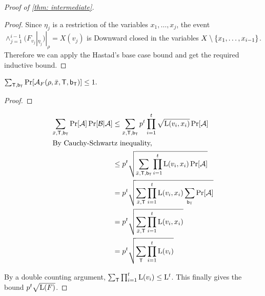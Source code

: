 \begin{proof}[Proof of \cref{thm: intermediate}]
\begin{proof}
Since $\eta_j$ is a restriction of the variables $x_1, \dots , x_j$, the event $\land_{j= 1}^{i-1}(F_{v_j}|_{\eta_j})|_\rho = X(v_j)$ is Downward closed in the variables $X \setminus \left\{ x_1, \dots , x_{i-1} \right\}$. 
Therefore we can apply the Hastad's base case bound and get the required inductive bound. 
\end{proof}
 
\begin{claim}
    $\sum_{\mathsf{\mathsf{T}},\mathsf{b_T}} \Pr[ \mathcal{A}_F(\rho,\bar{x}, \mathsf{T}, \mathsf{b_T})] \le 1.$ 
\end{claim}
\begin{proof}
    \todo{}
\end{proof}

\begin{align*}
\sum_{\bar{x},\mathsf{T},\mathsf{b_T}} \Pr[\mathcal{A}]\Pr[\mathcal{B}|\mathcal{A}] &\le \sum_{\bar{x},\mathsf{T},\mathsf{b_T}} p^t \prod_{i=1}^t\sqrt{\mathrm{L}(v_i,x_i)} \Pr[\mathcal{A}]\\
\intertext{By Cauchy-Schwartz inequality,}
&\le p^t\sqrt{\sum_{\bar{x}, \mathsf{T}, \mathsf{b_T}} \prod_{i=1}^t\mathrm{L}(v_i,x_i)\Pr[\mathcal{A}]}\\
&= p^t\sqrt{\sum_{\bar{x}, \mathsf{T}} \prod_{i=1}^t\mathrm{L}(v_i,x_i)\sum_{\mathsf{b_T}}\Pr[\mathcal{A}]}\\
&= p^t\sqrt{\sum_{\bar{x}, \mathsf{T}} \prod_{i=1}^t\mathrm{L}(v_i,x_i)}\\
&= p^t\sqrt{\sum_{\mathsf{T}} \prod_{i=1}^t \mathrm{L}(v_i)}
\end{align*}


By a double counting argument, $\sum_{\mathsf{T}}\prod_{i=1}^t\mathrm{L}(v_i) \le \mathrm{L}^t$.
This finally gives the bound $p^t\sqrt{\mathrm{L}(F)}$.
\end{proof}


